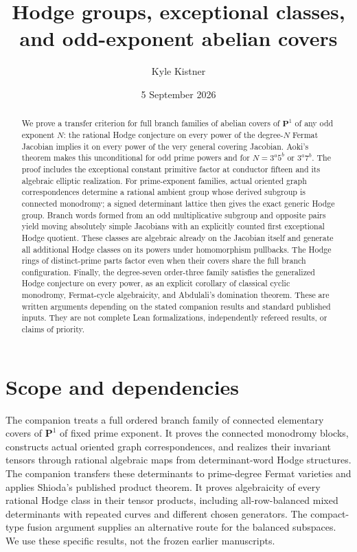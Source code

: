 \documentclass[11pt]{article}
\title{Hodge groups, exceptional classes, and odd-exponent abelian covers}
\author{Kyle Kistner}
\date{5 September 2026}
\theoremstyle{definition}
\begin{document}
\maketitle
\begin{abstract}
We prove a transfer criterion for full branch families of abelian covers
of $\mathbf P^1$ of any odd exponent $N$: the rational Hodge conjecture
on every power of the degree-$N$ Fermat Jacobian implies it on every
power of the very general covering Jacobian. Aoki's theorem makes this
unconditional for odd prime powers and for $N=3^a5^b$ or $3^a7^b$.
The proof includes the exceptional constant primitive factor at
conductor fifteen and its algebraic elliptic realization.
For prime-exponent families, actual oriented graph correspondences determine a rational
ambient group whose derived subgroup is connected monodromy; a signed
determinant lattice then gives the exact generic Hodge group. Branch
words formed from an odd multiplicative subgroup and opposite pairs yield
moving absolutely simple Jacobians with an explicitly counted first
exceptional Hodge quotient. These classes are algebraic already on the
Jacobian itself and generate all additional Hodge classes on its powers
under homomorphism pullbacks. The Hodge rings of distinct-prime parts
factor even when their covers share the full branch configuration. Finally,
the degree-seven order-three family satisfies the generalized Hodge conjecture
on every power, as an explicit corollary of classical cyclic monodromy,
Fermat-cycle algebraicity, and Abdulali's domination theorem. These are
written arguments depending on the stated companion results and standard
published inputs. They are not complete Lean formalizations, independently
refereed results, or claims of priority.
\end{abstract}

\section{Scope and dependencies}
The companion \cite{General} treats a full ordered branch family of connected
elementary covers of $\mathbf P^1$ of fixed prime exponent. It proves the
connected monodromy blocks, constructs actual oriented graph correspondences,
and realizes their invariant tensors through rational algebraic maps from
determinant-word Hodge structures. The companion
\cite[Corollary 1.2]{Fermat} transfers these determinants to prime-degree
Fermat varieties and applies Shioda's published product theorem. It proves
algebraicity of every rational Hodge class in their tensor products, including
all-row-balanced mixed determinants with repeated curves and different chosen
generators. The compact-type fusion argument \cite{Fusion} supplies an
alternative route for the balanced subspaces. We use these specific results,
not the frozen earlier manuscripts.
\end{document}
